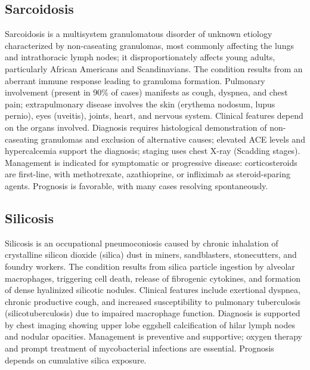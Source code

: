 \subsection{Sarcoidosis}
\label{sec:Sarcoidosis}
Sarcoidosis is a multisystem granulomatous disorder of unknown etiology characterized by non-caseating granulomas, most commonly affecting the lungs and intrathoracic lymph nodes; it disproportionately affects young adults, particularly African Americans and Scandinavians. The condition results from an aberrant immune response leading to granuloma formation. Pulmonary involvement (present in 90\% of cases) manifests as cough, dyspnea, and chest pain; extrapulmonary disease involves the skin (erythema nodosum, lupus pernio), eyes (uveitis), joints, heart, and nervous system. Clinical features depend on the organs involved. Diagnosis requires histological demonstration of non-caseating granulomas and exclusion of alternative causes; elevated ACE levels and hypercalcemia support the diagnosis; staging uses chest X-ray (Scadding stages). Management is indicated for symptomatic or progressive disease: corticosteroids are first-line, with methotrexate, azathioprine, or infliximab as steroid-sparing agents. Prognosis is favorable, with many cases resolving spontaneously.

\subsection{Silicosis}
\label{sec:Silicosis}
Silicosis is an occupational pneumoconiosis caused by chronic inhalation of crystalline silicon dioxide (silica) dust in miners, sandblasters, stonecutters, and foundry workers. The condition results from silica particle ingestion by alveolar macrophages, triggering cell death, release of fibrogenic cytokines, and formation of dense hyalinized silicotic nodules. Clinical features include exertional dyspnea, chronic productive cough, and increased susceptibility to pulmonary tuberculosis (silicotuberculosis) due to impaired macrophage function. Diagnosis is supported by chest imaging showing upper lobe eggshell calcification of hilar lymph nodes and nodular opacities. Management is preventive and supportive; oxygen therapy and prompt treatment of mycobacterial infections are essential. Prognosis depends on cumulative silica exposure.

